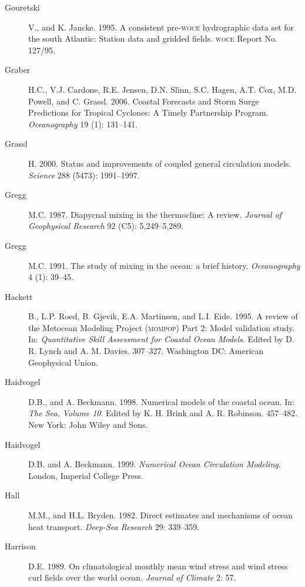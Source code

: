 \begin{description}
\item [Gouretski]V., and K. Jancke. 1995. A consistent
  pre-\textsc{woce} hydrographic data set for the south Atlantic:
  Station data and gridded fields.  \textsc{woce} Report No. 127/95.

\item [Graber]H.C., V.J. Cardone, R.E. Jensen, D.N. Slinn, S.C. Hagen,
  A.T. Cox, M.D. Powell, and C. Grassl. 2006. Coastal Forecasts and
  Storm Surge Predictions for Tropical Cyclones: A Timely Partnership
  Program. \textit{Oceanography} 19 (1): 131--141.

\item [Grassl]H. 2000. Status and improvements of coupled general
  circulation models. \textit{Science} 288 (5473): 1991--1997.

\item[Gregg]M.C. 1987. Diapycnal mixing in the thermocline: A review.
  \textit{Journal of Geophysical Research} 92 (C5): 5,249--5,289.

\item [Gregg]M.C. 1991. The study of mixing in the ocean: a brief
  history.  \textit{Oceanography} 4 (1): 39--45.

\item [Hackett]B., L.P. Roed, B. Gjevik, E.A. Martinsen, and
  L.I. Eide. 1995. A review of the Metocean Modeling Project
  (\textsc{mompop}) Part 2: Model validation study. In:
  \textit{Quantitative Skill Assessment for Coastal Ocean
    Models}. Edited by D. R. Lynch and
  A. M. Davies. 307--327. Washington DC: American Geophysical Union.

\item [Haidvogel]D.B., and A. Beckmann. 1998. Numerical models of the
  coastal ocean. In: \textit{The Sea, Volume 10}. Edited by
  K. H. Brink and A. R. Robinson. 457--482. New York: John Wiley and
  Sons.

\item [Haidvogel]D.B. and A. Beckmann. 1999. \textit{Numerical Ocean
  Circulation Modeling}. London, Imperial College Press.

\item [Hall]M.M., and H.L. Bryden. 1982. Direct estimates and
  mechanisms of ocean heat transport. \textit{Deep-Sea Research} 29:
  339--359.

\item [Harrison]D.E. 1989. On climatological monthly mean wind stress
  and wind stress curl fields over the world ocean. \textit{Journal of
    Climate} 2: 57.


\end{description}
